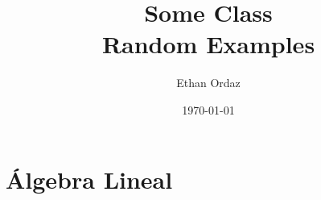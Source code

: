 \documentclass{report}
\title{\Huge{Some Class}\\Random Examples}
\author{\huge{Ethan Ordaz}}
\date{\today}
\begin{document}
\maketitle
\newpage%
\tableofcontents
\pagebreak
\chapter{Álgebra Lineal}



\end{document}
